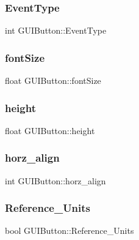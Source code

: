 \subsubsection{\texorpdfstring{Event\+Type}{EventType}}
{\footnotesize\ttfamily int G\+U\+I\+Button\+::\+Event\+Type}

\hypertarget{class_g_u_i_button_adcf183913688e46b9e173de16f7a2481}{}\label{class_g_u_i_button_adcf183913688e46b9e173de16f7a2481} 
\subsubsection{\texorpdfstring{font\+Size}{fontSize}}
{\footnotesize\ttfamily float G\+U\+I\+Button\+::font\+Size}

\hypertarget{class_g_u_i_button_a1126a7d91aa88611cc0f3b855343ad1b}{}\label{class_g_u_i_button_a1126a7d91aa88611cc0f3b855343ad1b} 
\subsubsection{\texorpdfstring{height}{height}}
{\footnotesize\ttfamily float G\+U\+I\+Button\+::height}

\hypertarget{class_g_u_i_button_a70201d3c0f7e6654b4c9eceb176a40ef}{}\label{class_g_u_i_button_a70201d3c0f7e6654b4c9eceb176a40ef} 
\subsubsection{\texorpdfstring{horz\+\_\+align}{horz\_align}}
{\footnotesize\ttfamily int G\+U\+I\+Button\+::horz\+\_\+align}

\hypertarget{class_g_u_i_button_a92255914ac7f50619836a1a33d33e845}{}\label{class_g_u_i_button_a92255914ac7f50619836a1a33d33e845} 
\subsubsection{\texorpdfstring{Reference\+\_\+\+Units}{Reference\_Units}}
{\footnotesize\ttfamily bool G\+U\+I\+Button\+::\+Reference\+\_\+\+Units}


